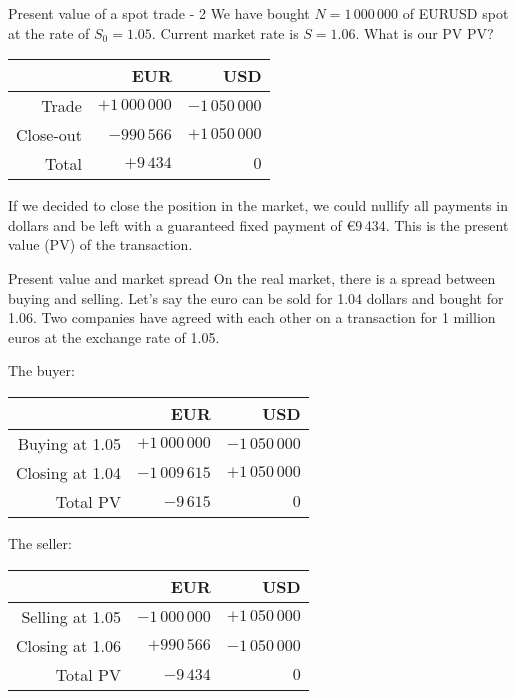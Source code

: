 \documentclass{beamer}
\renewcommand{\EUR}[1]{\textup{\euro}#1}
\begin{document}
\begin{frame}{Present value of a spot trade - 2}
\justify
We have bought $N=1\,000\,000$ of EURUSD spot at the rate of $S_0 = 1.05$. Current market rate is $S=1.06$. What is our PV PV?

\justify
\centering
\begin{tabular}{r|r|r}
         & EUR               & USD \\ \hline
Trade   & $+1\,000\,000$ & $-1\,050\,000$ \\
Close-out &    $-990\,566$ & $+1\,050\,000$ \\ \hline
Total    &      $+9\,434$ & $0$
\end{tabular}

\justify
If we decided to close the position in the market, we could nullify all payments in dollars and be left with a guaranteed fixed payment of \EUR{9\,434}. This is the present value (PV) of the transaction.
\end{frame}



\begin{frame}{Present value and market spread}
\justify
On the real market, there is a spread between buying and selling. Let's say the euro can be sold for 1.04 dollars and bought for 1.06. Two companies have agreed with each other on a transaction for 1 million euros at the exchange rate of 1.05.

\justify
The buyer:

\centering
\begin{tabular}{r|r|r}
                & EUR                   & USD \\ \hline
Buying at 1.05 & $+1\,000\,000$ & $-1\,050\,000$ \\
Closing at 1.04 & $-1\,009\,615$ & $+1\,050\,000$ \\ \hline
Total PV      &      $-9\,615$ & $0$
\end{tabular}

\justify
The seller:

\centering
\begin{tabular}{r|r|r}
                & EUR                   & USD \\ \hline
Selling at 1.05 & $-1\,000\,000$ & $+1\,050\,000$ \\
Closing at 1.06 & $+990\,566$ & $-1\,050\,000$ \\ \hline
Total PV      &      $-9\,434$ & $0$
\end{tabular} 
\end{frame}
\end{document}
